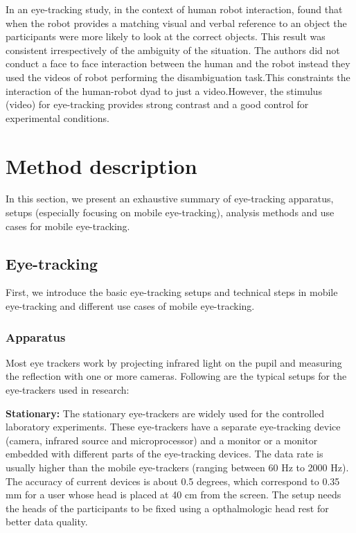 \documentclass{sig-alternate}
\begin{document}
In an eye-tracking study, in the context of human robot interaction, \cite{staudte2009visual} found that when the robot provides a matching visual and verbal reference to an object the participants were more likely to look at the correct objects. This result was consistent irrespectively of the ambiguity of the situation. The authors did not conduct a face to face interaction between the human and the robot instead they used the videos of robot performing the disambiguation task.This constraints the  interaction of the human-robot dyad to just a video.However, the stimulus (video) for eye-tracking provides strong contrast and a good control for experimental conditions.



\section{Method description}

In this section, we present an exhaustive summary of eye-tracking apparatus, setups (especially focusing on mobile eye-tracking), analysis methods and use cases for mobile eye-tracking. 

\label{method}

\subsection{Eye-tracking}
First, we introduce the basic eye-tracking setups and technical steps in mobile eye-tracking and different use cases of mobile eye-tracking.

\subsubsection{Apparatus}

Most eye trackers work by projecting infrared light on the pupil and measuring the reflection with one or more cameras. Following are the typical setups for the eye-trackers used in research:


 \textbf {Stationary:} The stationary eye-trackers are widely used for the controlled laboratory experiments. These eye-trackers have a separate eye-tracking device (camera, infrared source and microprocessor) and a monitor or a monitor embedded with different parts  of the eye-tracking devices. The data rate is usually higher than the mobile eye-trackers (ranging between 60 Hz to 2000 Hz). The accuracy of current devices is about 0.5 degrees, which correspond to 0.35 mm for a user whose head is placed at 40 cm from the screen.  The setup needs the heads of the participants to be fixed using a opthalmologic head rest for better data quality. 
\end{document}
